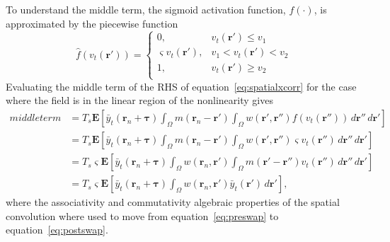 \documentclass[review,authoryear,3p]{elsarticle}
\begin{document}
To understand the middle term, the sigmoid activation function, $f(\cdot)$, is approximated by the piecewise function
\begin{equation}
	\hat{f}(v_t(\mathbf{r}')) = \left\{ \begin{array}{ll}
		0, & v_t(\mathbf{r}') \le v_1 \\
		\varsigma v_t(\mathbf{r}'), &  v_1 < v_t(\mathbf{r}') < v_2 \\
		1, & v_t(\mathbf{r}') \ge v_2 \\ 
		\end{array}\right.
\end{equation}
Evaluating the middle term of the RHS of equation~\ref{eq:spatialxcorr} for the case where the field is in the linear region of the nonlinearity gives
\begin{align}
	middle term &= T_s\mathbf{E}\left[ \bar{y}_t\left( \mathbf{r}_n + \boldsymbol{\tau} \right) \int_{\Omega}{ m\left(\mathbf{r}_n-\mathbf{r}'\right)\int_\Omega { w\left(\mathbf{r}',\mathbf{r}''\right) f\left(v_t\left(\mathbf{r}''\right)\right)\, d\mathbf{r}''}\, d\mathbf{r}'}\right]  \\
	&=T_s\mathbf{E}\left[ \bar{y}_t\left( \mathbf{r}_n + \boldsymbol{\tau} \right) \int_{\Omega}{ m\left(\mathbf{r}_n-\mathbf{r}'\right)\int_\Omega { w\left(\mathbf{r}',\mathbf{r}''\right) \varsigma v_t\left(\mathbf{r}''\right)\, d\mathbf{r}''}\, d\mathbf{r}'}\right] \label{eq:preswap}  \\
	&= T_s\varsigma\mathbf{E}\left[ \bar{y}_t\left( \mathbf{r}_n + \boldsymbol{\tau} \right) \int_{\Omega}{ w\left(\mathbf{r}_n,\mathbf{r}'\right) \int_\Omega {  m\left(\mathbf{r}'-\mathbf{r}''\right) v_t\left(\mathbf{r}''\right)\, d\mathbf{r}''}\, d\mathbf{r}'}\right]  \label{eq:postswap} \\
	&= T_s\varsigma\mathbf{E}\left[ \bar{y}_t\left( \mathbf{r}_n + \boldsymbol{\tau} \right) \int_{\Omega}{ w\left(\mathbf{r}_n,\mathbf{r}'\right) \bar{y}_t\left(\mathbf{r}'\right)\, d\mathbf{r}'}\right],	
\end{align}
where the associativity and commutativity algebraic properties of the spatial convolution where used to move from equation~\ref{eq:preswap} to equation~\ref{eq:postswap}.
% 
\end{document}
